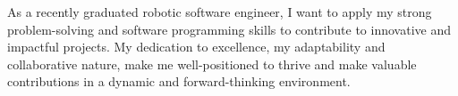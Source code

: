 \vspace{0.5em}
\begin{cvparagraph}
    As a recently graduated robotic software engineer, I want to apply my strong problem-solving and software programming skills to contribute to innovative and impactful projects. My dedication to excellence, my adaptability and collaborative nature, make me well-positioned to thrive and make valuable contributions in a dynamic and forward-thinking environment.
\end{cvparagraph}
